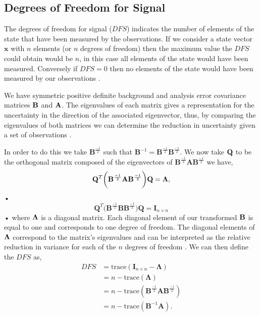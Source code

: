 \documentclass[11pt]{article}
\begin{document}
\subsection{Degrees of Freedom for Signal} \label{DFSintro}%

The degrees of freedom for signal ($DFS$) indicates the number of elements of the state that have been measured by the observations. If we consider a state vector $\textbf{x}$ with $n$ elements (or $n$ degrees of freedom) then the maximum value the $DFS$ could obtain would be $n$, in this case all elements of the state would have been measured. Conversely if $DFS = 0$ then no elements of the state would have been measured by our observations \cite{fowler2011measures}.

We have symmetric positive definite background and analysis error covariance matrices $\bf{B}$ and $\bf{A}$. The eigenvalues of each matrix gives a representation for the uncertainty in the direction of the associated eigenvector, thus, by comparing the eigenvalues of both matrices we can determine the reduction in uncertainty given a set of observations \cite{stewart2008correlated}.

In order to do this we take $\mathbf{B}^{\frac{-1}{2}}$ such that $\mathbf{B}^{-1} = \mathbf{B}^{\frac{-1}{2}}\mathbf{B}^{\frac{-1}{2}}$. We now take $\bf{Q}$ to be the orthogonal matrix composed of the eigenvectors of $\mathbf{B}^{\frac{-1}{2}}\mathbf{A}\mathbf{B}^{\frac{-1}{2}}$ we have,
\begin{equation}
\mathbf{Q}^{T}\bigg(\mathbf{B}^{\frac{-1}{2}}\mathbf{A}\mathbf{B}^{\frac{-1}{2}}\bigg)\mathbf{Q} = \bf{\Lambda},
\end{equation}• 
\begin{equation}
\mathbf{Q}^{T}\bigg(\mathbf{B}^{\frac{-1}{2}}\mathbf{B}\mathbf{B}^{\frac{-1}{2}}\bigg)\mathbf{Q} = \mathbf{I}_{n\times n}
\end{equation}•
where $\bf{\Lambda}$ is a diagonal matrix. Each diagonal element of our transformed $\bf{B}$ is equal to one and corresponds to one degree of freedom. The diagonal elements of $\bf{\Lambda}$ correspond to the matrix's eigenvalues and can be interpreted as the relative reduction in variance for each of the $n$ degrees of freedom \cite{sandu2012practical}. We can then define the $DFS$ as,
\begin{equation}
\begin{split}
DFS & = \text{trace}(\mathbf{I}_{n\times n} - \mathbf{\Lambda}) \\
       & = n - \text{trace}(\mathbf{\Lambda}) \\
       & = n - \text{trace}(\mathbf{B}^{\frac{-1}{2}}\mathbf{A}\mathbf{B}^{\frac{-1}{2}}) \\
       & = n - \text{trace}(\mathbf{B}^{-1}\mathbf{A}).
\end{split}
\end{equation}
\end{document}
